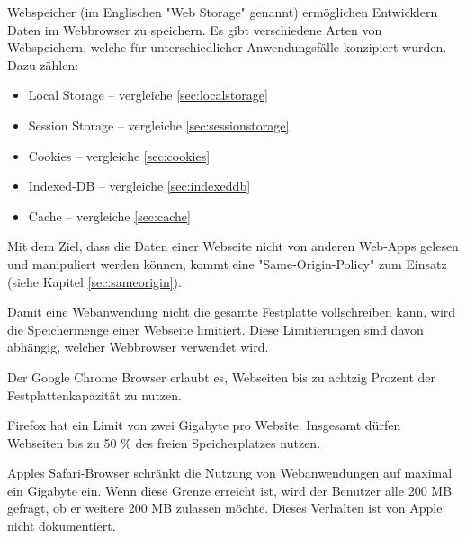 \label{sec:webstorage}


Webspeicher (im Englischen "Web Storage" genannt) ermöglichen Entwicklern %
Daten im Webbrowser zu speichern.
Es gibt verschiedene Arten von Webspeichern, welche für unterschiedlicher Anwendungsfälle konzipiert wurden. Dazu zählen:

\begin{itemize}
    \item Local Storage -- vergleiche \ref{sec:localstorage}
    \item Session Storage -- vergleiche \ref{sec:sessionstorage}
    \item Cookies -- vergleiche \ref{sec:cookies}
    \item Indexed-DB -- vergleiche \ref{sec:indexeddb}
    \item Cache -- vergleiche \ref{sec:cache}
\end{itemize}

Mit dem Ziel, dass die Daten einer Webseite nicht von anderen Web-Apps gelesen und manipuliert werden können, kommt eine  "Same-Origin-Policy" zum Einsatz (siehe Kapitel \ref{sec:sameorigin}).


Damit eine Webanwendung nicht die gesamte Festplatte vollschreiben kann, wird die Speichermenge einer Webseite limitiert. 
Diese Limitierungen sind davon abhängig, welcher Webbrowser verwendet wird. \cite{WebDevStorage}

Der Google Chrome Browser erlaubt es, Webseiten bis zu achtzig Prozent der Fest\-platten\-kapazität zu nutzen. 

Firefox hat ein Limit von zwei Gigabyte pro Website. Insgesamt dürfen Webseiten bis zu 50 \% des freien Speicherplatzes nutzen. 

Apples Safari-Browser schränkt die Nutzung von Webanwendungen auf maximal ein Gigabyte ein. 
Wenn diese Grenze erreicht ist, wird der Benutzer alle 200 MB gefragt, ob er weitere 200 MB zulassen möchte. 
Dieses Verhalten ist von Apple nicht dokumentiert. 

 \label{sec:sameorigin}

